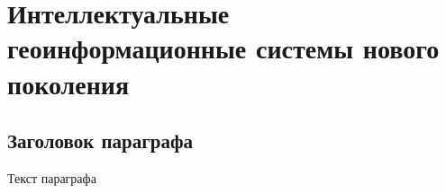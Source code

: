 
\chapter{Интеллектуальные геоинформационные системы нового поколения}
\label{chapter_gis}


\section{Заголовок параграфа}
Текст параграфа

%